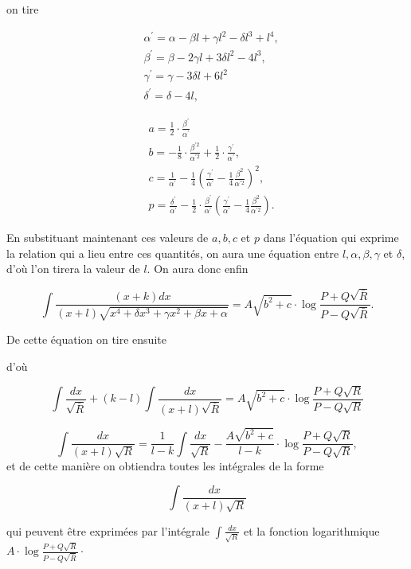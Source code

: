 \documentclass{article}
\begin{document}
on tire

\[
\begin{aligned}
& \alpha^{\prime}=\alpha-\beta l+\gamma l^{2}-\delta l^{3}+l^{4}, \\
& \beta^{\prime}=\beta-2 \gamma l+3 \delta l^{2}-4 l^{3}, \\
& \gamma^{\prime}=\gamma-3 \delta l+6 l^{2} \\
& \delta^{\prime}=\delta-4 l,
\end{aligned}
\]

\[
\begin{aligned}
& a=\frac{1}{2} \cdot \frac{\beta^{\prime}}{\alpha^{\prime}} \\
& b=-\frac{1}{8} \cdot \frac{\beta^{\prime 2}}{\alpha^{\prime 2}}+\frac{1}{2} \cdot \frac{\gamma^{\prime}}{\alpha^{\prime}}, \\
& c=\frac{1}{\alpha^{\prime}}-\frac{1}{4}\left(\frac{\gamma^{\prime}}{\alpha^{\prime}}-\frac{1}{4} \frac{\beta^{2}}{\alpha^{\prime 2}}\right)^{2}, \\
& p=\frac{\delta^{\prime}}{\alpha^{\prime}}-\frac{1}{2} \cdot \frac{\beta^{\prime}}{\alpha^{\prime}}\left(\frac{\gamma^{\prime}}{\alpha^{\prime}}-\frac{1}{4} \frac{\beta^{2}}{\alpha^{\prime 2}}\right) .
\end{aligned}
\]

En substituant maintenant ces valeurs de \(a, b, c\) et \(p\) dans l'équation qui exprime la relation qui a lieu entre ces quantités, on aura une équation entre \(l, \alpha, \beta, \gamma\) et \(\delta\), d'où l'on tirera la valeur de \(l\). On aura donc enfin

\[
\int \frac{(x+k) d x}{(x+l) \sqrt{x^{4}+\delta x^{3}+\gamma x^{2}+\beta x+\alpha}}=A \sqrt{b^{2}+c} \cdot \log \frac{P+Q \sqrt{\bar{R}}}{P-Q \sqrt{\bar{R}}} .
\]

De cette équation on tire ensuite

d'où

\[
\int \frac{d x}{\sqrt{\bar{R}}}+(k-l) \int \frac{d x}{(x+l) \sqrt{\bar{R}}}=A \sqrt{b^{2}+c} \cdot \log \frac{P+Q \sqrt{R}}{P-Q \sqrt{R}}
\]

\[
\int \frac{d x}{(x+l) \sqrt{R}}=\frac{1}{l-k} \int \frac{d x}{\sqrt{R}}-\frac{A \sqrt{b^{2}+c}}{l-k} \cdot \log \frac{P+Q \sqrt{R}}{P-Q \sqrt{R}},
\]
et de cette manière on obtiendra toutes les intégrales de la forme

\[
\int \frac{d x}{(x+l) \sqrt{R}}
\]

qui peuvent être exprimées par l'intégrale \(\int \frac{d x}{\sqrt{R}}\) et la fonction logarithmique \(A \cdot \log \frac{P+Q \sqrt{R}}{P-Q \sqrt{\bar{R}}} \cdot\)
\end{document}
